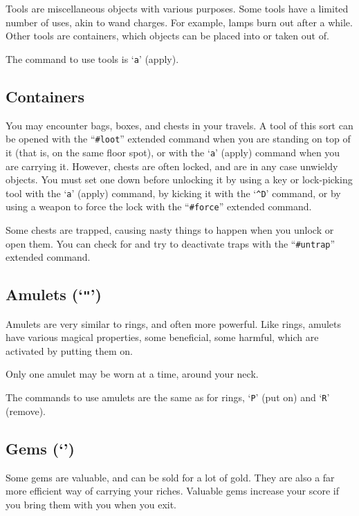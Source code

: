 Tools are miscellaneous objects with various purposes.  Some tools
have a limited number of uses, akin to wand charges.  For example, lamps burn
out after a while.  Other tools are containers, which objects can
be placed into or taken out of.

The command to use tools is `{\tt a}' (apply).

\subsection*{Containers}

You may encounter bags, boxes, and chests in your travels.  A tool of
this sort can be opened with the ``{\tt \#loot}'' extended command when
you are standing on top of it (that is, on the same floor spot),
or with the `{\tt a}' (apply) command when you are carrying it.  However,
chests are often locked, and are in any case unwieldy objects.
You must set one down before unlocking it by
using a key or lock-picking tool with the `{\tt a}' (apply) command,
by kicking it with the `{\tt \^{}D}' command,
or by using a weapon to force the lock with the ``{\tt \#force}''
extended command.

Some chests are trapped, causing nasty things to happen when you
unlock or open them.  You can check for and try to deactivate traps
with the ``{\tt \#untrap}'' extended command.

\subsection*{Amulets (`{\tt "}')}

Amulets are very similar to rings, and often more powerful.  Like
rings, amulets have various magical properties, some beneficial,
some harmful, which are activated by putting them on.

Only one amulet may be worn at a time, around your neck.

The commands to use amulets are the same as for rings, `{\tt P}' (put on)
and `{\tt R}' (remove).

\subsection*{Gems (`{\tt *}')}

Some gems are valuable, and can be sold for a lot of gold.  They are also
a far more efficient way of carrying your riches.  Valuable gems increase
your score if you bring them with you when you exit.

